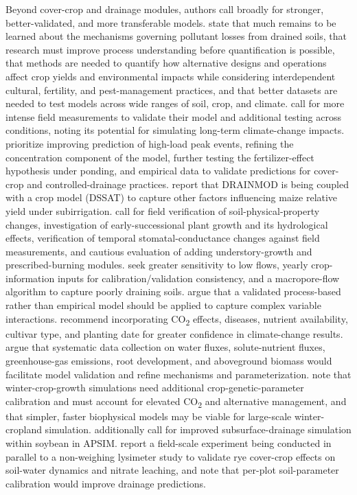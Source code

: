 Beyond cover-crop and drainage modules, authors call broadly for stronger, better-validated, and more transferable models. \textcite{SKAGGS1994} state that much remains to be learned about the mechanisms governing pollutant losses from drained soils, that research must improve process understanding before quantification is possible, that methods are needed to quantify how alternative designs and operations affect crop yields and environmental impacts while considering interdependent cultural, fertility, and pest-management practices, and that better datasets are needed to test models across wide ranges of soil, crop, and climate. \textcite{Negm2014} call for more intense field measurements to validate their model and additional testing across conditions, noting its potential for simulating long-term climate-change impacts. \textcite{Grewal2025} prioritize improving prediction of high-load peak events, refining the concentration component of the model, further testing the fertilizer-effect hypothesis under ponding, and empirical data to validate predictions for cover-crop and controlled-drainage practices. \textcite{Gunn2018} report that DRAINMOD is being coupled with a crop model (DSSAT) to capture other factors influencing maize relative yield under subirrigation. \textcite{Tian2012} call for field verification of soil-physical-property changes, investigation of early-successional plant growth and its hydrological effects, verification of temporal stomatal-conductance changes against field measurements, and cautious evaluation of adding understory-growth and prescribed-burning modules. \textcite{Morrison2014} seek greater sensitivity to low flows, yearly crop-information inputs for calibration/validation consistency, and a macropore-flow algorithm to capture poorly draining soils. \textcite{Smith2008} argue that a validated process-based rather than empirical model should be applied to capture complex variable interactions. \textcite{Ndulue2024} recommend incorporating CO\textsubscript{2} effects, diseases, nutrient availability, cultivar type, and planting date for greater confidence in climate-change results. \textcite{Ma2025} argue that systematic data collection on water fluxes, solute-nutrient fluxes, greenhouse-gas emissions, root development, and aboveground biomass would facilitate model validation and refine mechanisms and parameterization. \textcite{Li2025} note that winter-crop-growth simulations need additional crop-genetic-parameter calibration and must account for elevated CO\textsubscript{2} and alternative management, and that simpler, faster biophysical models may be viable for large-scale winter-cropland simulation. \textcite{Dietzel2016} additionally call for improved subsurface-drainage simulation within soybean in APSIM. \textcite{Qi2010b} report a field-scale experiment being conducted in parallel to a non-weighing lysimeter study to validate rye cover-crop effects on soil-water dynamics and nitrate leaching, and \textcite{Malone2007c} note that per-plot soil-parameter calibration would improve drainage predictions.

